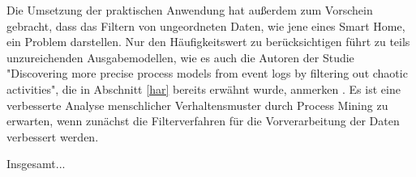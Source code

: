 Die Umsetzung der praktischen Anwendung hat außerdem zum Vorschein gebracht, dass das Filtern von ungeordneten Daten, wie jene eines Smart Home, ein Problem darstellen. Nur den Häufigkeitswert zu berücksichtigen führt zu teils unzureichenden Ausgabemodellen, wie es auch die Autoren der Studie "Discovering more precise process models from event logs by filtering out chaotic activities", die in Abschnitt \ref{har} bereits erwähnt wurde, anmerken \cite{Tax2019}. Es ist eine verbesserte Analyse menschlicher Verhaltensmuster durch Process Mining zu erwarten, wenn zunächst die Filterverfahren für die Vorverarbeitung der Daten verbessert werden.

Insgesamt...